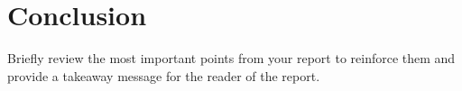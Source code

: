 \documentclass{sig-alternate-ipsn13}
\begin{document}

\section{Conclusion} 

Briefly review the most important points from your report to reinforce them and provide a takeaway message for the reader of the report. 


%
%  
\end{document}
